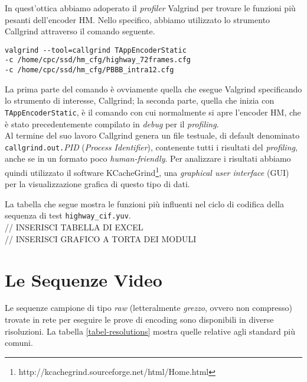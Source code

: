 In quest'ottica abbiamo adoperato il \emph{profiler} Valgrind per trovare le 
funzioni più pesanti dell'encoder HM. Nello specifico, abbiamo utilizzato lo 
strumento Callgrind attraverso il comando seguente. \\

\begin{lstlisting}[breaklines]
valgrind --tool=callgrind TAppEncoderStatic 
-c /home/cpc/ssd/hm_cfg/highway_72frames.cfg 
-c /home/cpc/ssd/hm_cfg/PBBB_intra12.cfg
\end{lstlisting}

La prima parte del comando è ovviamente quella che esegue Valgrind specificando 
lo strumento di interesse, Callgrind; la seconda parte, quella che inizia con 
\verb|TAppEncoderStatic|, è il comando con cui normalmente si apre l'encoder 
HM, che è stato precedentemente compilato in \emph{debug} per il 
\emph{profiling}. \\
Al termine del suo lavoro Callgrind genera un file testuale, di default 
denominato \verb|callgrind.out.|\textit{PID} (\textit{Process Identifier}), 
contenente tutti i risultati del \emph{profiling}, anche se in un formato poco 
\emph{human-friendly}. 
Per analizzare i risultati abbiamo quindi utilizzato il software 
KCacheGrind\footnote{http://kcachegrind.sourceforge.net/html/Home.html}, una 
\textit{graphical user interface} (GUI) per la visualizzazione grafica di 
questo tipo di dati.

La tabella che segue mostra le funzioni più influenti nel ciclo di codifica 
della sequenza di test \verb|highway_cif.yuv|. \\

// INSERISCI TABELLA DI EXCEL \\
// INSERISCI GRAFICO A TORTA DEI MODULI
\section{Le Sequenze Video}
Le sequenze campione di tipo \emph{raw} (letteralmente \emph{grezzo}, ovvero 
non compresso) trovate in rete per eseguire le prove di encoding sono 
disponibili in diverse risoluzioni. La tabella \ref{tabel-resolutions} mostra 
quelle relative agli standard più comuni.

